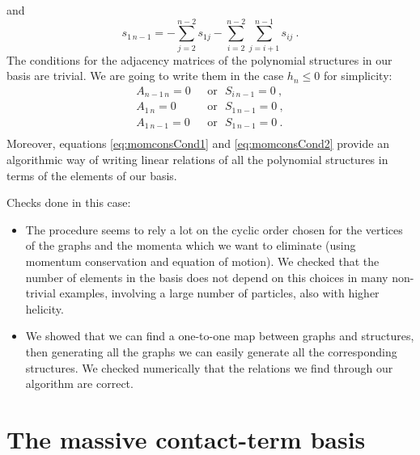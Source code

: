 \documentclass[aps,prd,nofootinbib,twocolumn,10pt]{revtex4-2}
\begin{document}
and
\begin{equation}
	\label{eq:momconsCond2}
	s_{1\, n-1} = - \sum_{j=2}^{n-2} s_{1 j} - \sum_{i=2}^{n-2} \sum_{j=i+1}^{n-1} s_{i j}\ .
\end{equation}
The conditions for the adjacency matrices of the polynomial structures in our basis are trivial. We are going to write them in the case $h_n\leq 0$ for simplicity:
\begin{equation}
	\begin{split}
		A_{n-1\, n} = 0 \ \ \ &\mathrm{or}\  \ \ S_{i\, n-1} = 0\ ,\\
		A_{1\, n} = 0 \ \ \ &\mathrm{or}\ \ \ S_{1\, n-1} = 0\ ,\\
		A_{1\, n-1} = 0 \ \ \ &\mathrm{or}\ \ \ S_{1\, n-1} = 0\ .\\
	\end{split}
\end{equation}
Moreover, equations \eqref{eq:momconsCond1} and \eqref{eq:momconsCond2} provide an algorithmic way of writing linear relations of all the polynomial structures in terms of the elements of our basis.

Checks done in this case:
\begin{itemize}
	\item The procedure seems to rely a lot on the cyclic order chosen for the vertices of the graphs and the momenta which we want to eliminate (using momentum conservation and equation of motion). We checked that the number of elements in the basis does not depend on this choices in many non-trivial examples, involving a large number of particles, also with higher helicity.
	\item We showed that we can find a one-to-one map between graphs and structures, then generating all the graphs we can easily generate all the corresponding structures. We checked numerically that the relations we find through our algorithm are correct.
\end{itemize}

\section{The massive contact-term basis}
\end{document}

